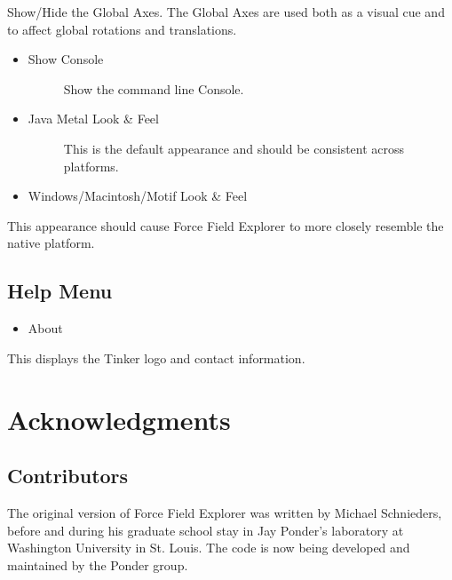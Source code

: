 \documentclass[letterpaper,11pt,english]{sphinxmanual}
\begin{document}
Show/Hide the Global Axes. The Global Axes are used both as a visual cue and to affect global rotations and translations.
\begin{itemize}
\item {} \begin{description}
\item[{Show Console}] \leavevmode
Show the command line Console.

\end{description}

\item {} \begin{description}
\item[{Java Metal Look \& Feel}] \leavevmode
This is the default appearance and should be consistent across platforms.

\end{description}

\item {} 
Windows/Macintosh/Motif Look \& Feel

\end{itemize}

This appearance should cause Force Field Explorer to more closely resemble the native platform.


\section{Help Menu}
\label{\detokenize{text/menus:help-menu}}\begin{itemize}
\item {} 
About

\end{itemize}

This displays the Tinker logo and contact information.


\chapter{Acknowledgments}
\label{\detokenize{text/acknowledgements:acknowledgments}}\label{\detokenize{text/acknowledgements::doc}}

\section{Contributors}
\label{\detokenize{text/acknowledgements:contributors}}
The original version of Force Field Explorer was written by Michael Schnieders, before and during his graduate school stay in Jay Ponder’s laboratory at Washington University in St. Louis. The code is now being developed and maintained by the Ponder group.
\end{document}

